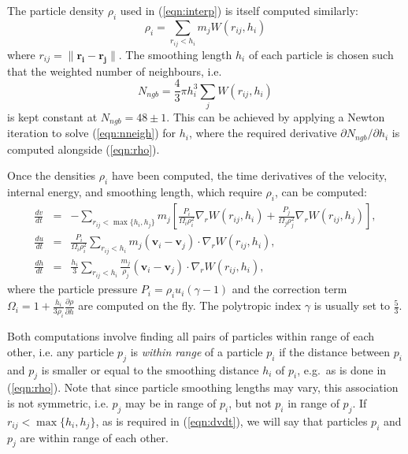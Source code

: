 \documentclass[final]{siamltex}
\newcommand{\eqn}[1]
    {(\ref{eqn:#1})}
\begin{document}
The particle density $\rho_i$ used in \eqn{interp} is itself
computed similarly:
%
\begin{equation}
    \rho_i = \sum_{r_{ij} < h_i} m_j W(r_{ij},h_i)
    \label{eqn:rho}
\end{equation}
%
where $r_{ij} = \|\mathbf{r_i}-\mathbf{r_j}\|$.
The smoothing length $h_i$ of each particle is chosen such that
the weighted number of neighbours, i.e.
%
\begin{equation*}
    N_{ngb} = \frac{4}{3}\pi h_i^3 \sum_j W( r_{ij} , h_i )
    \label{eqn:nneigh}
\end{equation*}
%
is kept constant at $N_{ngb}=48\pm 1$.
This can be achieved by applying a Newton iteration to solve
\eqn{nneigh} for $h_i$, where the required derivative
$\partial N_{ngb}/\partial h_i$ is computed alongside \eqn{rho}.

Once the densities $\rho_i$ have been computed,
the time derivatives
of the velocity, internal energy, and smoothing length, which
require $\rho_i$, can be computed:
%
\begin{eqnarray}
    \frac{dv}{dt} & = & -\sum_{r_{ij} < \max\{h_i,h_j\}} m_j \left[
        \frac{P_i}{\Omega_i\rho_i^2}\nabla_rW(r_{ij},h_i) +
        \frac{P_j}{\Omega_j\rho_j^2}\nabla_rW(r_{ij},h_j) \right], \label{eqn:dvdt} \\ 
    \frac{du}{dt} & = & \frac{P_i}{\Omega_i\rho_i^2} \sum_{r_{ij} < h_i} m_j(\mathbf v_i - \mathbf v_j) \cdot \nabla_rW(r_{ij},h_i), \label{eqn:dudt} \\
    \frac{dh}{dt} & = & \frac{h_i}{3}\sum_{r_{ij} < h_i} \frac{m_j}{\rho_j} (\mathbf v_i - \mathbf v_j) \cdot \nabla_rW(r_{ij},h_i), \label{eqn:dhdt}
\end{eqnarray}
%
where the particle pressure $P_i=\rho_i u_i (\gamma-1)$
and the correction term $\Omega_i=1 + \frac{h_i}{3\rho_i}\frac{\partial \rho}{\partial h}$
are computed on the fly.
The polytropic index $\gamma$ is usually set to $\frac{5}{3}$.

Both computations involve finding all pairs of particles
within range of each other, i.e.
any particle $p_j$ is {\em within range} of a particle $p_i$
if the distance between $p_i$ and $p_j$ is smaller or equal
to the smoothing distance $h_i$ of $p_i$, e.g.~as is done in \eqn{rho}.
Note that since particle smoothing lengths may vary, this
association is not symmetric, i.e. $p_j$ may be in range of
$p_i$, but not $p_i$ in range of $p_j$.
If $r_{ij} < \max\{h_i,h_j\}$, as is required in \eqn{dvdt},
we will say that particles $p_i$ and $p_j$ are within range
of each other.
\end{document}
